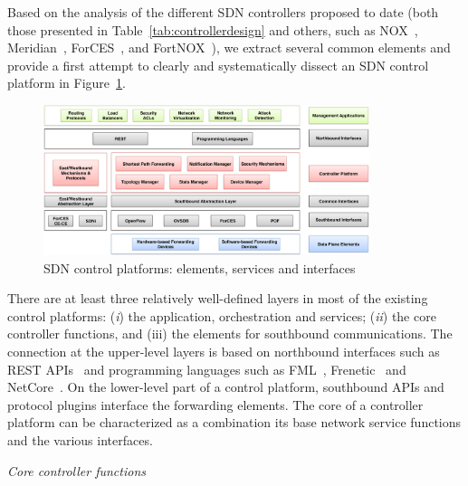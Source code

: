 Based on the analysis of the different SDN controllers proposed to date (both those presented in Table~\ref{tab:controllerdesign} and others, such as NOX~\cite{gude2008}, Meridian~\cite{banikazemi2013}, ForCES~\cite{doria2010}, and  FortNOX~\cite{porras2012}), we extract several common elements and provide a first attempt to clearly and systematically dissect an SDN control platform in Figure~\ref{fig:controlplatformarch}.

\begin{figure}[ht]
\centering
\includegraphics[width=0.85\textwidth]{figures/fig8_sdn_control_platform.pdf}
\caption{SDN control platforms: elements, services and interfaces}
\label{fig:controlplatformarch}
\end{figure}

There are at least three relatively well-defined layers in most of the existing control platforms: 
(\textit{i}) the application, orchestration and services; (\textit{ii})  the core controller functions, and 
(iii) the elements for southbound communications. The connection at the upper-level layers is based on northbound interfaces such as REST APIs~\cite{richardson2008restful}  and programming languages such as FML~\cite{hinrichs2009}, Frenetic~\cite{foster2011} and NetCore~\cite{monsanto2012}. 
On the lower-level part of a control platform, southbound APIs and protocol plugins interface the forwarding elements. %
The core of a controller platform can be characterized as a combination its base network service functions and the various interfaces. 


\vspace{2mm}
\noindent \textit{Core controller functions}

